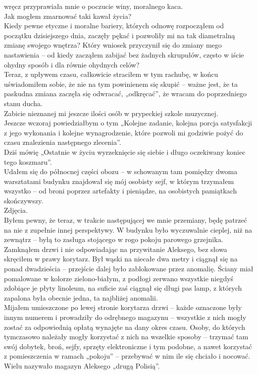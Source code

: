 \documentclass[../MAIN.tex]{subfiles}
\begin{document}
wręcz 
przyprawiała mnie o poczucie winy, moralnego kaca.\\
Jak mogłem zmarnować taki kawał życia?\\
Kiedy pewne etyczne i moralne bariery, których odnowę rozpocząłem od początku dzisiejszego dnia, zaczęły pękać i pozwoliły mi na tak diametralną zmianę swojego wnętrza? Który wniosek przyczynił się do zmiany mego nastawienia -- od kiedy zacząłem zabijać bez żadnych skrupułów, często w iście ohydny sposób i dla równie ohydnych celów?\\
Teraz, z upływem czasu, całkowicie straciłem w tym rachubę, w końcu uświadomiłem sobie, że nie na tym powinienem się skupić -- ważne jest, że ta paskudna zmiana zaczęła się odwracać, „odkręcać”, że wracam do poprzedniego stanu ducha.\\
Zabicie nieznanej mi jeszcze ilości osób w prypeckiej szkole muzycznej.\\
Jeszcze wczoraj powiedziałbym o tym „Kolejne zadanie, kolejna porcja satysfakcji z jego wykonania i kolejne wynagrodzenie, które pozwoli mi godziwie pożyć do czasu znalezienia następnego zlecenia”.\\
Dziś mówię „Ostatnie w życiu wyrzeknięcie się siebie i długo oczekiwany koniec tego koszmaru”.\\
Udałem się do północnej części obozu -- w schowanym tam pomiędzy dwoma warsztatami budynku znajdował się mój osobisty sejf, w którym trzymałem wszystko -- od broni poprzez artefakty i pieniądze, na osobistych pamiątkach skończywszy.\\
Zdjęcia.\\
Byłem pewny, że teraz, w trakcie następującej we mnie przemiany, będę patrzeć na nie z zupełnie innej perspektywy.
%
%
W budynku było wyczuwalnie cieplej, niż na zewnątrz -- byłą to zasługa stojącego w rogo pokoju parowego grzejnika.\\
Zamknąłem drzwi i nie odpowiadając na przywitanie Aleksego, bez słowa skręciłem w prawy korytarz. Był wąski na niecałe dwa metry i ciągnął się na ponad dwadzieścia -- przejście dalej było zablokowane przez anomalię. Ściany miał pomalowane w kolorze zielono-białym, z podłogi zerwano wszystkie niegdyś zdobiące je płyty linoleum, na suficie zaś ciągnął się długi pas lamp, z których zapalona była obecnie jedna, ta najbliżej anomalii.\\
Mijałem umieszczone po lewej stronie korytarza drzwi -- każde oznaczone były innym numerem i prowadziły do odrębnego magazynu -- wszystkie z nich mogły zostać za odpowiednią opłatą wynajęte na dany okres czasu. Osoby, do których tymczasowo należały mogły korzystać z nich na wszelkie sposoby -- trzymać tam swój dobytek, broń, sejfy, sprzęty elektroniczne i tym podobne, a nawet korzystać z pomieszczenia w ramach „pokoju” -- przebywać w nim ile się chciało i nocować. Wielu nazywało magazyn Aleksego „drugą Polisią”.\\
\end{document}
